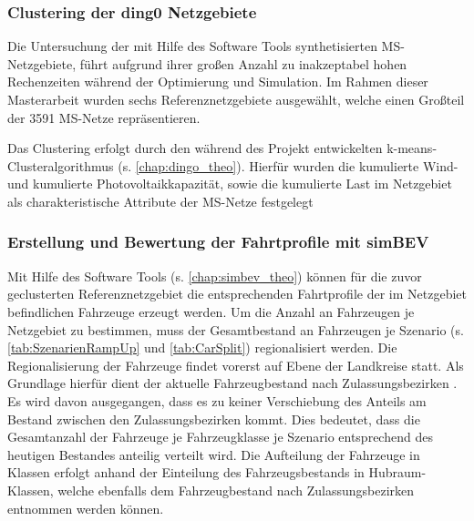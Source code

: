 \subsubsection{Clustering der ding0 Netzgebiete}


Die Untersuchung der mit Hilfe des Software Tools \dingo synthetisierten \gls{MS}-Netzgebiete, führt aufgrund ihrer großen Anzahl zu inakzeptabel hohen Rechenzeiten während der Optimierung und Simulation.
Im Rahmen dieser Masterarbeit wurden sechs Referenznetzgebiete ausgewählt, welche einen Großteil der \num{3591} \gls{MS}-Netze repräsentieren.\medskip

Das Clustering erfolgt durch den während des \openego Projekt entwickelten k-means-Clusteralgorithmus (s. \autoref{chap:dingo_theo}).
Hierfür wurden die kumulierte Wind- und kumulierte Photovoltaikkapazität, sowie die kumulierte Last im Netzgebiet als charakteristische Attribute der \gls{MS}-Netze festgelegt


\subsubsection{Erstellung und Bewertung der Fahrtprofile mit simBEV}

Mit Hilfe des Software Tools \simbev (s. \autoref{chap:simbev_theo}) können für die zuvor geclusterten Referenznetzgebiet die entsprechenden Fahrtprofile der im Netzgebiet befindlichen Fahrzeuge erzeugt werden.
Um die Anzahl an Fahrzeugen je Netzgebiet zu bestimmen, muss der Gesamtbestand an Fahrzeugen je Szenario (s. \autoref{tab:SzenarienRampUp} und \autoref{tab:CarSplit}) regionalisiert werden.
Die Regionalisierung der Fahrzeuge findet vorerst auf Ebene der Landkreise statt.
Als Grundlage hierfür dient der aktuelle Fahrzeugbestand nach Zulassungsbezirken \cite[][Stand: ]{KBAPLZ2020}.
Es wird davon ausgegangen, dass es zu keiner Verschiebung des Anteils am Bestand zwischen den Zulassungsbezirken kommt.
Dies bedeutet, dass die Gesamtanzahl der Fahrzeuge je Fahrzeugklasse je Szenario entsprechend des heutigen Bestandes anteilig verteilt wird.
Die Aufteilung der Fahrzeuge in Klassen erfolgt anhand der Einteilung des Fahrzeugsbestands in Hubraum-Klassen, welche ebenfalls dem Fahrzeugbestand nach Zulassungsbezirken entnommen werden können.\medskip

